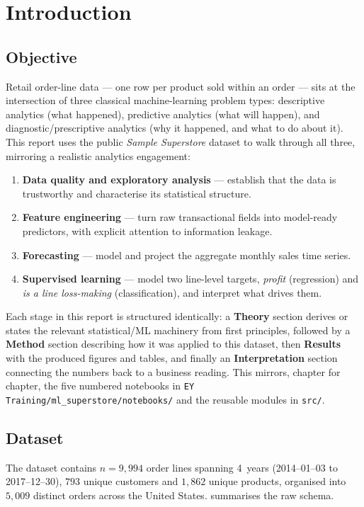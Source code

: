 \chapter{Introduction}
\label{ch:intro}

\section{Objective}
Retail order-line data — one row per product sold within an order — sits at
the intersection of three classical machine-learning problem types:
descriptive analytics (what happened), predictive analytics (what will
happen), and diagnostic/prescriptive analytics (why it happened, and what
to do about it). This report uses the public \emph{Sample Superstore}
dataset to walk through all three, mirroring a realistic analytics
engagement:

\begin{enumerate}[label=\arabic*.]
  \item \textbf{Data quality and exploratory analysis} — establish that the
        data is trustworthy and characterise its statistical structure.
  \item \textbf{Feature engineering} — turn raw transactional fields into
        model-ready predictors, with explicit attention to information
        leakage.
  \item \textbf{Forecasting} — model and project the aggregate monthly
        sales time series.
  \item \textbf{Supervised learning} — model two line-level targets,
        \emph{profit} (regression) and \emph{is a line loss-making}
        (classification), and interpret what drives them.
\end{enumerate}

Each stage in this report is structured identically: a \textbf{Theory}
section derives or states the relevant statistical/ML machinery from first
principles, followed by a \textbf{Method} section describing how it was
applied to this dataset, then \textbf{Results} with the produced figures
and tables, and finally an \textbf{Interpretation} section connecting the
numbers back to a business reading. This mirrors, chapter for chapter, the
five numbered notebooks in \texttt{EY Training/ml\_superstore/notebooks/}
and the reusable modules in \texttt{src/}.

\section{Dataset}
The dataset contains $n = 9{,}994$ order lines spanning
\SI{4}{years} (2014--01--03 to 2017--12--30), $793$ unique customers and
$1{,}862$ unique products, organised into $5{,}009$ distinct orders across
the United States.  summarises the raw schema.

